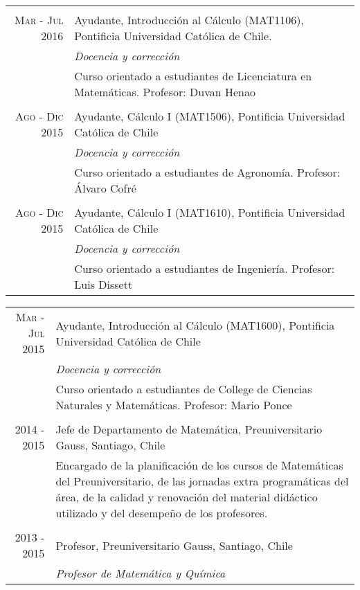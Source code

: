 \documentclass[a4paper,10pt]{article}
\begin{document}
\begin{tabular}{r|p{11cm}}
\multicolumn{2}{c}{} \\

\textsc{Mar - Jul 2016}
 	&	Ayudante, Introducción al Cálculo (MAT1106), Pontificia Universidad Católica de Chile. \\
	&	\emph{Docencia y corrección}	\\
	&	\footnotesize{Curso orientado a estudiantes de Licenciatura en Matemáticas. Profesor: Duvan Henao}	\\

\multicolumn{2}{c}{} \\

\textsc{Ago - Dic 2015}
 	&	Ayudante, Cálculo I (MAT1506), Pontificia Universidad Católica de Chile \\
	&	\emph{Docencia y corrección}	\\
	&	\footnotesize{Curso orientado a estudiantes de Agronomía. Profesor: Álvaro Cofré}	\\

\multicolumn{2}{c}{} \\

\textsc{Ago - Dic 2015}
 	&	Ayudante, Cálculo I (MAT1610), Pontificia Universidad Católica de Chile \\
	&	\emph{Docencia y corrección}	\\
	&	\footnotesize{Curso orientado a estudiantes de Ingeniería. Profesor: Luis Dissett}	\\
\end{tabular}
	
\begin{tabular}{r|p{11cm}}

\textsc{Mar - Jul 2015}
 	&	Ayudante, Introducción al Cálculo (MAT1600), Pontificia Universidad Católica de Chile \\
	&	\emph{Docencia y corrección}	\\
	&	\footnotesize{Curso orientado a estudiantes de College de Ciencias Naturales y Matemáticas. Profesor: Mario Ponce}	\\

\multicolumn{2}{c}{} \\

\textsc{2014 - 2015}
 	&	Jefe de Departamento de Matemática, Preuniversitario Gauss, Santiago, Chile \\
	&	\footnotesize{Encargado de la planificación de los cursos de Matemáticas del Preuniversitario, de las jornadas extra programáticas del área, de la calidad y renovación del material didáctico utilizado y del desempeño de los profesores.}	\\

\multicolumn{2}{c}{} \\

\textsc{2013 - 2015}
 	&	Profesor, Preuniversitario Gauss, Santiago, Chile \\
	&	\emph{Profesor de Matemática y Química}	\\

\end{tabular}
\end{document}
